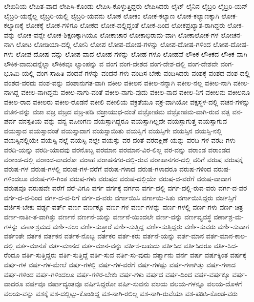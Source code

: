 {ಲೇಖನಿಯ
ಲೇಪಿತ-ವಾದ
ಲೇಪಿಸಿ-ಕೊಂಡು
ಲೇಪಿಸಿ-ಕೊಳ್ಳುತ್ತಿದ್ದರು
ಲೇಪಿಸಿದರು
ಲೈಟ್
ಲೈನಿನ
ಲೈಬ್ರರಿ
ಲೈಬ್ರರಿ-ಯನ್
ಲೈಬ್ರರಿ-ಯನ್ನೆಲ್ಲ
ಲೈಬ್ರರಿ-ಯಲ್ಲಿ
ಲೈಬ್ರರಿ-ಯವನು
ಲೋಕ
ಲೋಕಂ
ಲೋಕ-ಕಲ್ಯಾಣ
ಲೋಕ-ಕಲ್ಯಾಣಕ್ಕಾಗಿ
ಲೋಕ-ಕಲ್ಯಾಣಕ್ಕೆ
ಲೋಕಕ್ಕೆ
ಲೋಕ-ಗಳಿಗೂ
ಲೋಕದ
ಲೋಕ-ದಲ್ಲಿದ್ದಂತೆ
ಲೋಕ-ದಿಂದ
ಲೋಕಪ್ರಖ್ಯಾತ-ರಾಗಿದ್ದರು
ಲೋಕ-ವನ್ನು
ಲೋಕ-ವನ್ನೇ
ಲೋಕ-ಶಿಕ್ಷಣಕ್ಕಾಗಿಯೂ
ಲೋಕಾಚಾರ
ಲೋಕಾಭಿರಾಮ-ವಾಗಿ
ಲೋಕಾಲೋಕ-ಗಳ
ಲೋಚನ-ನಾಗಿ
ಲೋಟ
ಲೋಡಿಯಾ-ದಲ್ಲಿ
ಲೋನಿ
ಲೋಪ
ಲೋಪ-ದೋಷ-ಗಳನ್ನು
ಲೋಪ-ದೋಷ-ಗಳಿಂದ
ಲೋಪ-ದೋಷ-ಗಳು
ಲೋಪ-ದೋಷ-ವನ್ನು
ಲೋಪ-ವಾದ
ಲೋಹ-ಗಳನ್ನು
ಲೋಹ-ಗಳೂ
ಲೋಹವೆ
ಲೌಕಿಕ
ಲೌಕಿಕದ
ಲೌಕಿಕ-ವಾಗಿ
ಲೌಕಿಕ-ವಾದುದನ್ನೆಲ್ಲಾ
ಲೌಕಿಕವೂ
ಲ್ಯಾಂಪನ್ನು
ವ
ವಂಗ
ವಂಗ-ದೇಶದ
ವಂಗ-ದೇಶ-ದಲ್ಲಿ
ವಂಗ-ದೇಶವೇ
ವಂಗ-ಭೂಮಿ-ಯಲ್ಲಿ
ವಂಗ-ಸಾಹಿತಿ
ವಂದನೆ-ಗಳನ್ನು
ವಂದನೆ-ಗಳು
ವಂದಿಸ-ಬೇಕು
ವಂದಿಸಿದರು
ವಂಶಕ್ಕೆ
ವಂಶದ
ವಂಶ-ದಲ್ಲಿ
ವಂಶದ-ವರದು
ವಂಶ-ವನ್ನು
ವಂಶಾನುಗತ-ವಾಗಿ
ವಕೀಲ
ವಕೀಲನ
ವಕೀಲ-ನನ್ನಾಗಿ
ವಕೀಲ-ನಲ್ಲ
ವಕೀಲ-ನಾಗಿ
ವಕೀಲ-ನಾಗಿದ್ದ
ವಕೀಲ-ನಾಗಿದ್ದನು
ವಕೀಲ-ನಾಗು-ವಂತೆ
ವಕೀಲ-ನಾಗು-ವುದು
ವಕೀಲ-ನಾದ
ವಕೀಲ-ನಿಗೆ
ವಕೀಲನು
ವಕೀಲನೂ
ವಕೀಲ-ರಾದ
ವಕೀಲರು
ವಕೀಲ-ರೊಡನೆ
ವಕೀಲಿ
ವಕೀಲಿಯ
ವಕ್ರತೆಯೂ
ವಕ್ರ-ವಾಗಿಯೋ
ವಕ್ಷಸ್ಥಳ-ದಲ್ಲಿ
ವಚನ-ಗಳನ್ನು
ವಚನ-ವನ್ನು
ವಜಾ
ವಜ್ರ
ವಜ್ರದ
ವಜ್ರ-ಪಡಿ
ವಜ್ರಾಯುಧ-ದಂತೆ
ವಜ್ರೋಪಮ
ವಜ್ರೋಪಮ-ವಾಗಿ-ರುವ
ವತ್ಸ
ವನ-ಪರ್ವ
ವನಸ್ಪತಿಯ
ವನ್ನು
ವನ್ಯ
ವಪೀಂಗಣ
ವಯಸ್ಸಾಗಿದ್ದರೂ
ವಯಸ್ಸಾಗಿಲ್ಲದೇ
ವಯಸ್ಸಾಗುತ್ತ
ವಯಸ್ಸಾಗುವ
ವಯಸ್ಸಾದ
ವಯಸ್ಸಾದಂತೆ
ವಯಸ್ಸಾದಾಗ
ವಯಸ್ಸಾಯಿತು
ವಯಸ್ಸಿಗೆ
ವಯಸ್ಸಿಗೇ
ವಯಸ್ಸಿನ
ವಯಸ್ಸಿ-ನಲ್ಲಿ
ವಯಸ್ಸಿನಲ್ಲಿಯೇ
ವಯಸ್ಸಿ-ನಲ್ಲೆ
ವಯಸ್ಸಿ-ನಲ್ಲೇ
ವಯಸ್ಸು
ವರ-ದಂತೆ
ವರದಕ್ಷಿಣೆ-ಯನ್ನು
ವರದಿ-ಗಳ
ವರದಿ-ಗಳು
ವರದಿ-ಯನ್ನು
ವರದಿ-ಯಾದವು
ವರನೊಬ್ಬ
ವರಮಾನ
ವರಮಾನ-ವಿರ-ಲಿಲ್ಲ
ವರ-ವನ್ನು
ವರಾಂಡ
ವರಾಂಡದ
ವರಾಂಡ-ದಲ್ಲಿ
ವರಾಂಡ-ವಾದರೋ
ವರಾಹ
ವರಾಹನಗರ-ದಲ್ಲಿ-ರುವ
ವರಾಹಾನಗರ-ದಲ್ಲಿ
ವರಿಗೆ
ವರುಷ
ವರುಷಕ್ಕೆ
ವರುಷ-ಗಳ
ವರುಷ-ಗಳಲ್ಲಿ
ವರುಷ-ಗಳ-ವರೆಗೆ
ವರುಷ-ಗಳಾದ
ವರುಷ-ಗಳಾದರೂ
ವರುಷ-ಗಳಿಂದ
ವರುಷ-ಗಳಿಂದಲೂ
ವರುಷ-ಗಳಿ-ಗಿಂತ
ವರುಷ-ಗಳು
ವರುಷದ
ವರುಷ-ದಲ್ಲಿಯೇ
ವರುಷ-ದ-ವರೆಗೆ
ವರುಷ-ವಾದಾಗ
ವರುಷವೂ
ವರುಷವೇ
ವರೆಗೆ
ವರೆ-ವಿಗೂ
ವರ್ಗ
ವರ್ಗಕ್ಕೆ
ವರ್ಗದ
ವರ್ಗ-ದಲ್ಲಿ
ವರ್ಗ-ದಲ್ಲಿ-ರುವ-ವರು
ವರ್ಗ-ದ-ವರ
ವರ್ಗ-ದ-ವ-ರಿಂದ
ವರ್ಗ-ದ-ವ-ರಿಗೆ
ವರ್ಗ-ದ-ವರು
ವರ್ಗಾಯಿಸಿ
ವರ್ಗಾಯಿ-ಸಿತು
ವರ್ಗಾಯಿಸಿದ್ದರು
ವರ್ಚಸ್ಸಿಗೆ
ವರ್ಜಿಸ-ಬೇಕು
ವರ್ಡ್ಸ-ವರ್ತ್
ವರ್ಣ
ವರ್ಣಕ್ಕೂ
ವರ್ಣ-ಗಳ
ವರ್ಣ-ಗಳನ್ನು
ವರ್ಣ-ಗಳಲ್ಲಿ
ವರ್ಣ-ಗಳು
ವರ್ಣ-ಚಿತ್ರ
ವರ್ಣ-ನಾತೀ-ತ-ವಾಗಿತ್ತು
ವರ್ಣನೆ
ವರ್ಣನೆ-ಯನ್ನು
ವರ್ಣನೆ-ಯಿಂದಲೇ
ವರ್ಣ-ವನ್ನು
ವರ್ಣವ್ಯವಸ್ಥೆ
ವರ್ಣಾಶ್ರ-ಮ-ಗಳನ್ನು
ವರ್ಣಾಶ್ರಮದ
ವರ್ಣಿ-ಸಲು
ವರ್ಣಿ-ಸುತ್ತಾರೆ
ವರ್ಣಿ-ಸುತ್ತಿದ್ದ
ವರ್ಣಿ-ಸುತ್ತಿದ್ದರು
ವರ್ಣಿ-ಸುವರು
ವರ್ಣಿ-ಸುವಾಗ
ವರ್ತಂತೇ
ವರ್ತಕ
ವರ್ತಕನ
ವರ್ತಕ-ನೊಬ್ಬ
ವರ್ತಕರ
ವರ್ತ-ಕರು
ವರ್ತನೆ-ಯನ್ನು
ವರ್ತ-ಮಾನ
ವರ್ತ-ಮಾನ-ಕಾಲ-ದಲ್ಲಿ
ವರ್ತ-ಮಾನತೆ
ವರ್ತ-ಮಾನದ
ವರ್ತ-ಮಾನ-ವನ್ನು
ವರ್ತಿಸ-ಬಹುದು
ವರ್ತಿಸಿದ
ವರ್ತಿಸಿದರೂ
ವರ್ತಿ-ಸಿದ-ರೆಂದೂ
ವರ್ತಿ-ಸುತ್ತಿದ್ದರು
ವರ್ತಿ-ಸುತ್ತಿದ್ದೆ
ವರ್ತಿ-ಸುವ
ವರ್ತಿ-ಸು-ವುದು
ವರ್ತ್ಮಾನು
ವರ್ನ
ವರ್ಷ
ವರ್ಷಕ್ಕಿಂತ
ವರ್ಷಕ್ಕೆ
ವರ್ಷ-ಗಳ
ವರ್ಷ-ಗಳ-ಮೇಲೆ
ವರ್ಷ-ಗಳಲ್ಲಿ
ವರ್ಷ-ಗಳ-ವರೆಗೆ
ವರ್ಷ-ಗಳಷ್ಟು
ವರ್ಷ-ಗಳಾಗಿತ್ತು
ವರ್ಷ-ಗಳಾದ
ವರ್ಷ-ಗಳಿಂದ
ವರ್ಷ-ಗಳಿಂದಲೂ
ವರ್ಷ-ಗಳಿರ-ಬೇಕು
ವರ್ಷ-ಗಳು
ವರ್ಷದ
ವರ್ಷ-ದಿಂದ
ವರ್ಷ-ವರ್ಷಕ್ಕೂ
ವರ್ಷ-ವಾದರೂ
ವರ್ಷವೂ
ವರ್ಷಾದ್ಯಂತವೂ
ವರ್ಷಿಸಿದ್ದರೋ
ವರ್ಷಿ-ಸುವನು
ವಲಯ
ವಲಯ-ಗಳನ್ನೂ
ವಲಯ-ದೊಳಗೆ
ವಲಯ-ವನ್ನು
ವಶಕ್ಕೆ
ವಶ-ದಲ್ಲಿಟ್ಟು-ಕೊಂಡಿದ್ದ
ವಶ-ನಾಗಿ-ರಲಿಲ್ಲ
ವಶ-ನಾಗಿ-ರುವೆಯಾ
ವಶ-ಪಡಿಸಿ-ಕೊಂಡ-ವರು
}
